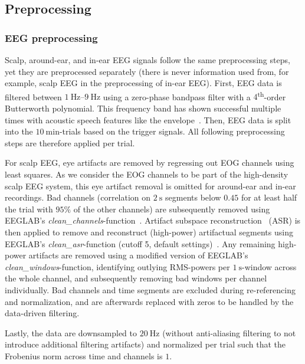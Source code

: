 \documentclass[fleqn,10pt]{wlscirep}
\begin{document}
	\subsection*{Preprocessing}
	
	\subsubsection*{EEG preprocessing}
	Scalp, around-ear, and in-ear EEG signals follow the same preprocessing steps, yet they are preprocessed separately (there is never information used from, for example, scalp EEG in the preprocessing of in-ear EEG). First, EEG data is filtered between $\SIrange{1}{9}{\hertz}$ using a zero-phase bandpass filter with a $4$\textsuperscript{th}-order Butterworth polynomial. This frequency band has shown successful multiple times with acoustic speech features like the envelope~\cite{osullivan2014attentional,mirkovic2015decoding,geirnaert2021eegBased}. Then, EEG data is split into the $\SI{10}{\minute}$-trials based on the trigger signals. All following preprocessing steps are therefore applied per trial. 
	
	For scalp EEG, eye artifacts are removed by regressing out EOG channels using least squares. As we consider the EOG channels to be part of the high-density scalp EEG system, this eye artifact removal is omitted for around-ear and in-ear recordings. Bad channels (correlation on $\SI{2}{\second}$ segments below $0.45$ for at least half the trial with $95\%$ of the other channels) are subsequently removed using EEGLAB's \textit{clean\_channels}-function~\cite{delorme2004eeglab}. Artifact subspace reconstruction~\cite{chang2020evaluation} (ASR) is then applied to remove and reconstruct (high-power) artifactual segments using EEGLAB's \textit{clean\_asr}-function (cutoff 5, default settings)~\cite{delorme2004eeglab}. Any remaining high-power artifacts are removed using a modified version of EEGLAB's \textit{clean\_windows}-function, identifying outlying RMS-powers per $\SI{1}{\second}$-window across the whole channel, and subsequently removing bad windows per channel individually. Bad channels and time segments are excluded during re-referencing and normalization, and are afterwards replaced with zeros to be handled by the data-driven filtering. 
	
	Lastly, the data are downsampled to $\SI{20}{\hertz}$ (without anti-aliasing filtering to not introduce additional filtering artifacts) and normalized per trial such that the Frobenius norm across time and channels is $1$.
	
\end{document}
